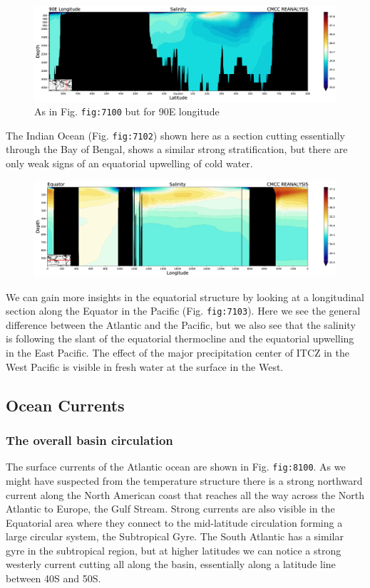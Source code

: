 \begin{figure}
\centering
\includegraphics[width = .7 \textwidth]{figs/GD/SectSal90E5000.png}
\caption{As in Fig. \texttt{fig:7100} but for 90E longitude}
\end{figure}

The Indian Ocean (Fig. \texttt{fig:7102}) shown here as a section
cutting essentially through the Bay of Bengal, shows a similar strong
stratification, but there are only weak signs of an equatorial upwelling
of cold water.

\begin{figure}
\centering
\includegraphics[width = .7 \textwidth]{figs/GD/SectSalinityEquator1000.png}
\caption{} \label{fig:}
\end{figure}

We can gain more insights in the equatorial structure by looking at a
longitudinal section along the Equator in the Pacific (Fig.
\texttt{fig:7103}). Here we see the general difference between the
Atlantic and the Pacific, but we also see that the salinity is following
the slant of the equatorial thermocline and the equatorial upwelling in
the East Pacific. The effect of the major precipitation center of ITCZ
in the West Pacific is visible in fresh water at the surface in the
West.

\subsection{Ocean Currents}\label{ocean-currents}

\subsubsection{The overall basin
circulation}\label{the-overall-basin-circulation}

The surface currents of the Atlantic ocean are shown in Fig.
\texttt{fig:8100}. As we might have suspected from the temperature
structure there is a strong northward current along the North American
coast that reaches all the way across the North Atlantic to Europe, the
Gulf Stream. Strong currents are also visible in the Equatorial area
where they connect to the mid-latitude circulation forming a large
circular system, the Subtropical Gyre. The South Atlantic has a similar
gyre in the subtropical region, but at higher latitudes we can notice a
strong westerly current cutting all along the basin, essentially along a
latitude line between 40S and 50S.

